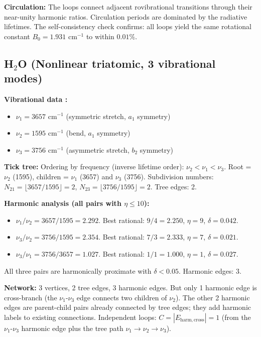 \documentclass[11pt,a4paper]{article}
\theoremstyle{definition}
\theoremstyle{remark}
\begin{document}
\textbf{Circulation:} The loops connect adjacent rovibrational transitions through their near-unity harmonic ratios. Circulation periods are dominated by the radiative lifetimes. The self-consistency check confirms: all loops yield the same rotational constant $B_0 = 1.931$ cm$^{-1}$ to within $0.01\%$.

\subsection{H$_2$O (Nonlinear triatomic, 3 vibrational modes)}

\textbf{Vibrational data \citep{shimanouchi1972, nist_webbook}:}
\begin{itemize}[nosep]
\item $\nu_1 = 3657$ cm$^{-1}$ (symmetric stretch, $a_1$ symmetry)
\item $\nu_2 = 1595$ cm$^{-1}$ (bend, $a_1$ symmetry)
\item $\nu_3 = 3756$ cm$^{-1}$ (asymmetric stretch, $b_2$ symmetry)
\end{itemize}

\textbf{Tick tree:} Ordering by frequency (inverse lifetime order): $\nu_2 < \nu_1 < \nu_3$. Root = $\nu_2$ (1595), children = $\nu_1$ (3657) and $\nu_3$ (3756). Subdivision numbers: $N_{21} = \lfloor 3657/1595 \rfloor = 2$, $N_{23} = \lfloor 3756/1595 \rfloor = 2$. Tree edges: 2.

\textbf{Harmonic analysis (all pairs with $\eta \leq 10$):}

\begin{itemize}[nosep]
\item $\nu_1/\nu_2 = 3657/1595 = 2.292$. Best rational: $9/4 = 2.250$, $\eta = 9$, $\delta = 0.042$.
\item $\nu_3/\nu_2 = 3756/1595 = 2.354$. Best rational: $7/3 = 2.333$, $\eta = 7$, $\delta = 0.021$.
\item $\nu_3/\nu_1 = 3756/3657 = 1.027$. Best rational: $1/1 = 1.000$, $\eta = 1$, $\delta = 0.027$.
\end{itemize}

All three pairs are harmonically proximate with $\delta < 0.05$. Harmonic edges: 3.

\textbf{Network:} 3 vertices, 2 tree edges, 3 harmonic edges. But only 1 harmonic edge is cross-branch (the $\nu_1$-$\nu_3$ edge connects two children of $\nu_2$). The other 2 harmonic edges are parent-child pairs already connected by tree edges; they add harmonic labels to existing connections. Independent loops: $C = |E_{\mathrm{harm,cross}}| = 1$ (from the $\nu_1$-$\nu_3$ harmonic edge plus the tree path $\nu_1 \to \nu_2 \to \nu_3$).
\end{document}
